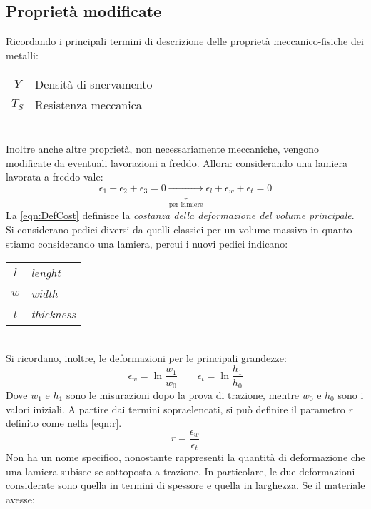 \subsection{Proprietà modificate}
Ricordando i principali termini di descrizione delle proprietà meccanico-fisiche dei metalli:\\
\begin{tabular}{cl}
$Y$ & Densità di snervamento\\
$T_S$& Resistenza meccanica\\
\end{tabular}
\\
Inoltre anche altre proprietà, non necessariamente meccaniche, vengono modificate da eventuali lavorazioni a freddo.
Allora: considerando una lamiera lavorata a freddo vale:
\begin{equation}
\epsilon_1 + \epsilon_2 + \epsilon_3 = 0 \underbrace{\rightarrow}_{\text{per lamiere}}
\epsilon_l + \epsilon_w + \epsilon_t = 0 
\label{eqn:DefCost}
\end{equation}
La \ref{eqn:DefCost} definisce la \emph{costanza della deformazione del volume principale}.
Si considerano pedici diversi da quelli classici per un volume massivo in quanto stiamo considerando una lamiera, percui i nuovi pedici indicano:\\
\begin{tabular}{cl}
$l$ & \textit{lenght}\\
$w$ & \textit{width}\\
$t$ & \textit{thickness}\\
\end{tabular}
\\
Si ricordano, inoltre, le deformazioni per le principali grandezze:
\begin{equation}
\epsilon_w = \ln{\frac{w_1}{w_0}} \qquad \epsilon_t = \ln{\frac{h_1}{h_0}}
\label{eqn:DefPrinc}
\end{equation}
Dove $w_1$ e $h_1$ sono le misurazioni dopo la prova di trazione, mentre $w_0$ e $h_0$ sono i valori iniziali.
A partire dai termini sopraelencati, si può definire il parametro $r$ definito come nella \ref{eqn:r}.
\begin{equation}
r = \frac{\epsilon_w}{\epsilon_t}
\label{eqn:r}
\end{equation}
Non ha un nome specifico, nonostante rappresenti la quantità di deformazione che una lamiera subisce se sottoposta a trazione.
In particolare, le due deformazioni considerate sono quella in termini di spessore e quella in larghezza.
Se il materiale avesse:
